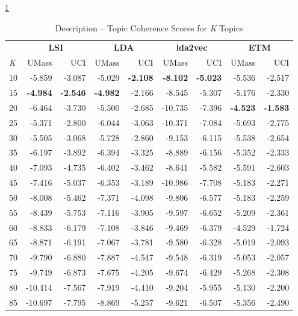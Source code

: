 \documentclass[letterpaper,12pt]{article}
\begin{document}
\ref{tab:combo_description_tc}
\begin{table}
	\caption{\label{tab:combo_description_tc} Description -- Topic Coherence Scores for \emph{K} Topics}
	\begin{center}
		\begin{tabular}{|l|rr|rr|rr|rr|}
			\hline
			{} & \multicolumn{2}{c|}{\textbf{LSI}} & \multicolumn{2}{c|}{\textbf{LDA}} & \multicolumn{2}{c|}{\textbf{lda2vec}} & \multicolumn{2}{c|}{\textbf{ETM}} \\
			\emph{K} &   UMass &    UCI &  UMass &    UCI &   UMass &    UCI &  UMass &    UCI \\
			\hline
			10  &  -5.859 & -3.087 & -5.029 & \textbf{-2.108} &  \textbf{-8.102} & \textbf{-5.023} & -5.536 & -2.517 \\
			15  &  \textbf{-4.984} & \textbf{-2.546} & \textbf{-4.982} & -2.166 &  -8.545 & -5.307 & -5.176 & -2.330 \\
			20  &  -6.464 & -3.730 & -5.500 & -2.685 & -10.735 & -7.396 & \textbf{-4.523} & \textbf{-1.583} \\
			25  &  -5.371 & -2.800 & -6.044 & -3.063 & -10.371 & -7.084 & -5.693 & -2.775 \\
			30  &  -5.505 & -3.068 & -5.728 & -2.860 &  -9.153 & -6.115 & -5.538 & -2.654 \\
			35  &  -6.197 & -3.892 & -6.394 & -3.325 &  -8.889 & -6.156 & -5.352 & -2.333 \\
			40  &  -7.093 & -4.735 & -6.402 & -3.462 &  -8.641 & -5.582 & -5.591 & -2.603 \\
			45  &  -7.416 & -5.037 & -6.353 & -3.189 & -10.986 & -7.708 & -5.183 & -2.271 \\
			50  &  -8.008 & -5.462 & -7.371 & -4.098 &  -9.806 & -6.577 & -5.183 & -2.259 \\
			55  &  -8.439 & -5.753 & -7.116 & -3.905 &  -9.597 & -6.652 & -5.209 & -2.361 \\
			60  &  -8.833 & -6.179 & -7.108 & -3.846 &  -9.469 & -6.379 & -4.529 & -1.724 \\
			65  &  -8.871 & -6.191 & -7.067 & -3.781 &  -9.580 & -6.328 & -5.019 & -2.093 \\
			70  &  -9.790 & -6.880 & -7.887 & -4.547 &  -9.548 & -6.319 & -5.053 & -2.057 \\
			75  &  -9.749 & -6.873 & -7.675 & -4.205 &  -9.674 & -6.429 & -5.268 & -2.308 \\
			80  & -10.414 & -7.567 & -7.919 & -4.410 &  -9.204 & -5.955 & -5.130 & -2.200 \\
			85  & -10.697 & -7.795 & -8.869 & -5.257 &  -9.621 & -6.507 & -5.356 & -2.490 \\

\end{tabular}
\end{center}
\end{table}
\end{document}
